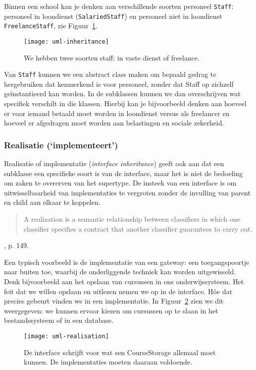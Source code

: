 Binnen een school kan je denken aan verschillende soorten personeel 
\texttt{Staff}: personeel in loondienst (\texttt{SalariedStaff}) en 
personeel niet in loondienst \texttt{FreelanceStaff}, zie Figuur~\ref{fig:uml-inheritance}. 

\begin{figure}[H]
    \centering
    \texttt{[image: uml-inheritance]}
    \caption{We hebben twee soorten staff: in vaste dienst of freelance.}
    \label{fig:uml-inheritance}
\end{figure}

Van \texttt{Staff} kunnen we een abstract class maken 
om bepaald gedrag te hergebruiken dat kenmerkend is voor personeel, zonder 
dat Staff op zichzelf geïnstantieerd kan worden. 
In de subklassen kunnen we dan overschrijven
wat specifiek verschilt in die klassen. Hierbij kan je bijvoorbeeld denken aan 
hoeveel er voor iemand betaald moet worden in loondienst versus als freelancer 
en hoeveel er afgedragen moet worden aan belastingen en sociale zekerheid.

\subsubsection{Realisatie (`implementeert')}
Realisatie of implementatie (\textit{interface inheritance}) geeft ook aan 
dat een subklasse een specifieke soort is van de interface, maar het is 
niet de bedoeling om zaken te overerven van het supertype. De insteek van 
een interface is om uitwisselbaarheid van implementaties te vergroten zonder 
de invulling van parent en child aan elkaar te koppelen.

\blockquote{
    A realization is a semantic relationship between classifiers
    in which one classifier specifies a contract that another
    classifier guarantees to carry out. 
}{\cite{Booch1999}, p. 149.}

Een typisch voorbeeld is de implementatie van een gateway: 
een toegangspoortje naar buiten toe, waarbij de onderliggende 
techniek kan worden uitgewisseld. Denk bijvoorbeeld aan het opslaan 
van cursussen in ons onderwijssysteem. Het feit dat we willen opslaan en uitlezen 
nemen we op in de interface. Hóe dat precies gebeurt vinden we in een implementatie.
In Figuur~\ref{fig:uml-realisation} zien we dit weergegeven: we kunnen ervoor 
kiezen om cursussen op te slaan in het bestandssysteem of in een database.

\begin{figure}[H]
    \centering
    \texttt{[image: uml-realisation]}
    \caption{De interface schrijft voor wat een CourseStorage allemaal moet kunnen. De implementaties moeten daaraan voldoende.}
    \label{fig:uml-realisation}
\end{figure}

